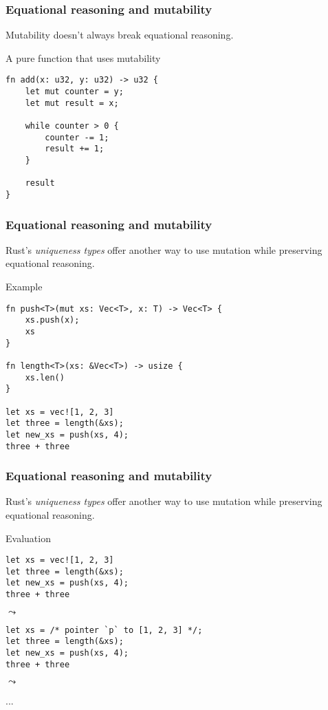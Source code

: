 \documentclass[t]{beamer}
\begin{document}
\begin{frame}[fragile]
\frametitle{Equational reasoning and mutability}

Mutability doesn't always break equational reasoning.

\begin{block}{A pure function that uses mutability}
\begin{verbatim}
fn add(x: u32, y: u32) -> u32 {
    let mut counter = y;
    let mut result = x;
    
    while counter > 0 {
        counter -= 1;
        result += 1;
    }
    
    result
}
\end{verbatim}
\end{block}

\end{frame}


\begin{frame}[fragile]
\frametitle{Equational reasoning and mutability}
Rust's \emph{uniqueness types} offer another way to use mutation while
preserving equational reasoning.

\begin{block}{Example}
\begin{verbatim}
fn push<T>(mut xs: Vec<T>, x: T) -> Vec<T> {
    xs.push(x);
    xs
}

fn length<T>(xs: &Vec<T>) -> usize {
    xs.len()
}

let xs = vec![1, 2, 3]
let three = length(&xs);
let new_xs = push(xs, 4);
three + three
\end{verbatim}
\end{block}

\end{frame}


\begin{frame}[fragile]
\frametitle{Equational reasoning and mutability}
Rust's \emph{uniqueness types} offer another way to use mutation while
preserving equational reasoning.

\begin{block}{Evaluation}

\begin{verbatim}
let xs = vec![1, 2, 3]
let three = length(&xs);
let new_xs = push(xs, 4);
three + three
\end{verbatim}

\(\leadsto\)

\begin{verbatim}
let xs = /* pointer `p` to [1, 2, 3] */;
let three = length(&xs);
let new_xs = push(xs, 4);
three + three
\end{verbatim}

\(\leadsto\)

...

\end{block}

\end{frame}
\end{document}
